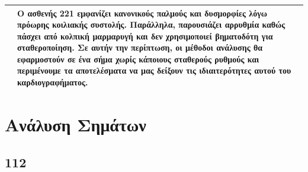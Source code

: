\documentclass[11pt,a4paper]{article}
\begin{document}
\begin{center}
\begin{tabular}{| >{\centering\arraybackslash}m{1cm} | >{\centering\arraybackslash}m{15cm}|}
 \hline
 221 & Ο ασθενής 221 εμφανίζει κανονικούς παλμούς και δυσμορφίες λόγω πρόωρης κοιλιακής συστολής. Παράλληλα, παρουσιάζει αρρυθμία καθώς πάσχει από κολπική μαρμαρυγή και δεν χρησιμοποιεί βηματοδότη για σταθεροποίηση. Σε αυτήν την περίπτωση, οι μέθοδοι ανάλυσης θα εφαρμοστούν σε ένα σήμα χωρίς κάποιους σταθερούς ρυθμούς και περιμένουμε τα αποτελέσματα να μας δείξουν τις ιδιαιτερότητες αυτού του καρδιογραφήματος.\\ 
 \hline
\end{tabular}
\end{center}


\section*{Ανάλυση Σημάτων}
\subsection*{112}
\end{document}
